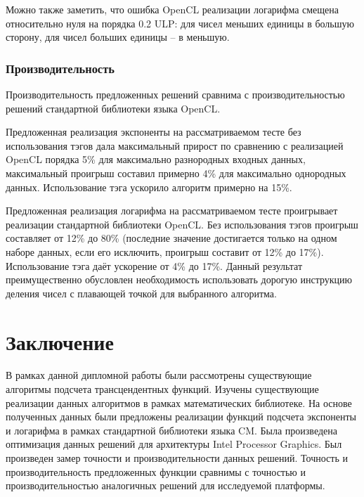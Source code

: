 Можно также заметить, что ошибка OpenCL реализации логарифма смещена относительно нуля на порядка 0.2 ULP: для чисел меньших единицы в большую сторону, для чисел больших единицы -- в меньшую.

\subsection{Производительность}

Производительность предложенных решений сравнима с производительностью решений стандартной библиотеки языка OpenCL.

Предложенная реализация экспоненты на рассматриваемом тесте без использования тэгов дала максимальный прирост по сравнению с реализацией OpenCL порядка 5\% для максимально разнородных входных данных, максимальный проигрыш составил примерно 4\% для максимально однородных данных.
Использование тэга ускорило алгоритм примерно на 15\%.

Предложенная реализация логарифма на рассматриваемом тесте проигрывает реализации стандартной библиотеки OpenCL.
Без использования тэгов проигрыш составляет от 12\% до 80\% (последние значение достигается только на одном наборе данных, если его исключить, проигрыш составит от 12\% до 17\%).
Использование тэга даёт ускорение от 4\% до 17\%.
Данный результат преимущественно обусловлен необходимость использовать дорогую инструкцию деления чисел с плавающей точкой для выбранного алгоритма.

\chapter{Заключение}

В рамках данной дипломной работы были рассмотрены существующие алгоритмы подсчета трансцендентных функций.
Изучены существующие реализации данных алгоритмов в рамках математических библиотеке.
На основе полученных данных были предложены реализации функций подсчета экспоненты и логарифма в рамках стандартной библиотеки языка CM.
Была произведена оптимизация данных решений для архитектуры \foreignlanguage{english}{Intel Processor Graphics}.
Был произведен замер точности и производительности данных решений.
Точность и производительность предложенных функции сравнимы с точностью и производительностью аналогичных решений для исследуемой платформы.
